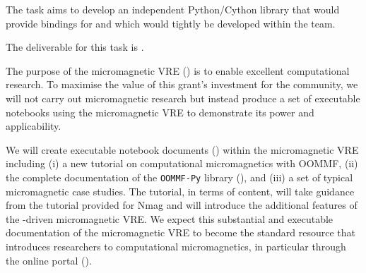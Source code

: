 \begin{workpackage}
\begin{tasklist}
\begin{task}[title=Visualization system for 3d data in web-notebook
,id=vis3d,lead=SR, partners={US,PS,USO}]
\begin{task}[lead=UB,title=Python/Cython bindings for Pari,PM=16,id=pari-python]
  The task aims to develop an independent Python/Cython library that would provide
  bindings for \PariGP and which would tightly be developed within the \PariGP team.

  The deliverable for this task is .
\end{task}

\begin{task}[lead=USO,title=Demonstrator: micromagnetic VRE notebooks,
  id=oommf-tutorial-and-documentation, PM=6, partners={SR,PS}]

  The purpose of the micromagnetic VRE
  () is to enable excellent
  computational research. To maximise the value of this grant's investment for the
  community, we will not carry out micromagnetic research but instead
  produce a set of executable notebooks using the micromagnetic VRE
  to demonstrate its power and applicability.

  We will create executable notebook documents
  () within the micromagnetic VRE
  including (i) a new tutorial on computational micromagnetics with
  OOMMF, (ii) the complete documentation of the \texttt{OOMMF-Py}
  library (),
  and (iii) a set of typical micromagnetic case studies. The tutorial,
  in terms of content, will take guidance from the tutorial provided
  for Nmag \cite{Nmag-tutorial-url} and will introduce the additional
  features of the \Jupyter-driven micromagnetic VRE. We expect this
  substantial and executable documentation of the micromagnetic VRE to
  become the standard resource that introduces researchers to
  computational micromagnetics, in particular through the online
  portal ().


\end{task}
\end{task}
\end{tasklist}
\end{workpackage}
